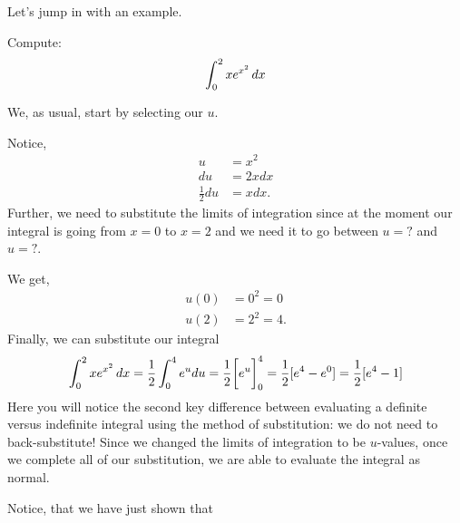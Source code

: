 \documentclass{ximera}
\begin{document}
Let's jump in with an example.

\begin{example}
Compute:
\[
\int_0^2 x e^{x^2}\mathop{}\!d x
\]
\begin{explanation}
We, as usual, start by selecting our $u$.

Notice,
\begin{align*}
u&=x^2\\
du&=2xdx\\
\frac{1}{2}du&=xdx.
\end{align*}
Further, we need to substitute the limits of integration since at the moment our integral is going from $x=0$ to $x=2$ and we need it to go between $u=?$ and $u=?$.

We get,
\begin{align*}
u(0) &= 0^2 = 0  \\
u(2) &=2^2 = 4.
\end{align*}
Finally, we can substitute our integral
\[
\int_0^2 x e^{x^2}\mathop{}\!d x
=\frac{1}{2}\int_0^{4} e^{u} du=\frac{1}{2}\bigg[ e^u \bigg]_0^4=\frac{1}{2}[e^4-e^0]=\frac{1}{2}[e^4-1]\]
Here you will notice the second key difference between evaluating a definite versus indefinite integral using the method of substitution: we do not need to back-substitute! Since we changed the limits of integration to be $u$-values, once we complete all of our substitution, we are able to evaluate the integral as normal. 


Notice, that we have just shown that


\end{explanation}
\end{example}
\end{document}

